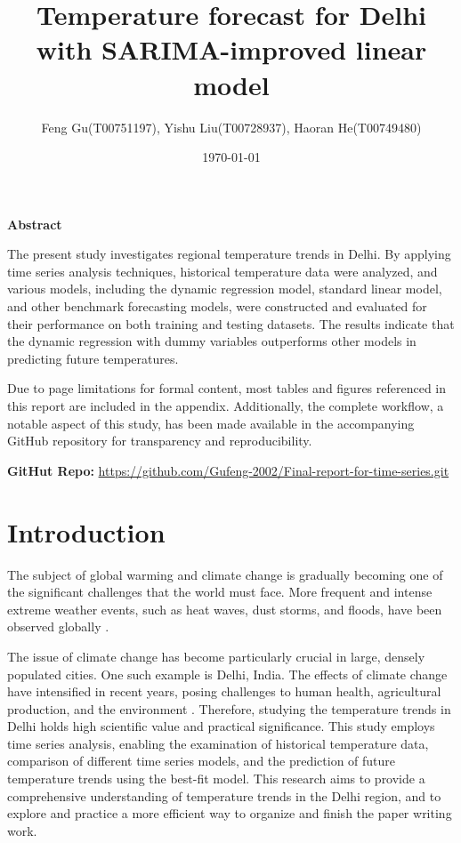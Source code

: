 \documentclass[12pt]{article}
\title{Temperature forecast for Delhi with SARIMA-improved linear model}
\author{Feng Gu(T00751197), Yishu Liu(T00728937), Haoran He(T00749480)}
\date{\today}
\begin{document}
\maketitle

\begin{center}
    \textbf{\large Abstract}
\end{center}

The present study investigates regional temperature trends in Delhi.
 By applying time series analysis techniques, historical temperature data were analyzed, and various models, 
 including the dynamic regression model, standard linear model, and other benchmark forecasting models, 
 were constructed and evaluated for their performance on both training and testing datasets. 
 The results indicate that the dynamic regression with dummy variables outperforms other models in predicting 
 future temperatures. 

Due to page limitations for formal content, most tables and figures referenced in this report 
are included in the appendix. Additionally, the complete workflow, a notable aspect of this study, 
has been made available in the accompanying GitHub repository for transparency and reproducibility.

\textbf{GitHut Repo:} \href{https://github.com/Gufeng-2002/Final-report-for-time-series.git}
{https://github.com/Gufeng-2002/Final-report-for-time-series.git}



\section{Introduction}
\sloppy
The subject of global warming and climate change is gradually becoming one of the significant challenges 
that the world must face. More frequent and intense extreme weather events, such as heat waves, dust storms, 
and floods, have been observed globally \cite{dabhade2021}. 

The issue of climate change has become particularly crucial in large, densely populated cities. 
One such example is Delhi, India. The effects of climate change have intensified in recent years, 
posing challenges to human health, agricultural production, and the environment 
\cite{hussain2024}. 
Therefore, studying the temperature trends in Delhi holds high scientific value and practical significance. 
\sloppy
This study employs time series analysis, enabling the examination of historical temperature data,
comparison of different time series models, and the prediction of future temperature trends using the 
best-fit model. This research aims to provide a comprehensive understanding of temperature trends in the Delhi region,
and to explore and practice a more efficient way to organize and finish the paper writing work.
\end{document}

